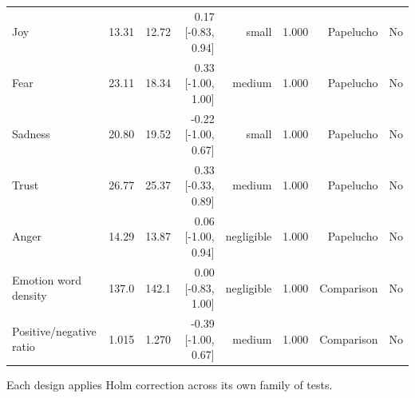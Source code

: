 \begin{table}[htbp]
\begin{tabular}{lrrrrrrr}
Joy & 13.31 & 12.72 & 0.17 [-0.83, 0.94] & small & 1.000 & Papelucho & No \\
Fear & 23.11 & 18.34 & 0.33 [-1.00, 1.00] & medium & 1.000 & Papelucho & No \\
Sadness & 20.80 & 19.52 & -0.22 [-1.00, 0.67] & small & 1.000 & Papelucho & No \\
Trust & 26.77 & 25.37 & 0.33 [-0.33, 0.89] & medium & 1.000 & Papelucho & No \\
Anger & 14.29 & 13.87 & 0.06 [-1.00, 0.94] & negligible & 1.000 & Papelucho & No \\
Emotion word density & 137.0 & 142.1 & 0.00 [-0.83, 1.00] & negligible & 1.000 & Comparison & No \\
Positive/negative ratio & 1.015 & 1.270 & -0.39 [-1.00, 0.67] & medium & 1.000 & Comparison & No \\
\bottomrule
\end{tabular}
\vspace{0.5em}
\begin{minipage}{\linewidth}\footnotesize Each design applies Holm correction across its own family of tests.\end{minipage}
\end{table}

